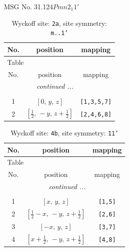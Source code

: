 \documentclass[fleqn,8pt]{jsarticle}
\begin{document}
\setcounter{MaxMatrixCols}{32}

\renewcommand{\tablename}{Table~}
\renewcommand{\figurename}{Figure~}
\begin{center}
\LARGE
MSG No. 31.124\quad$Pmn2_{1}1'$
\end{center}
\renewcommand{\arraystretch}{1.2}
\begin{longtable}{ccc}
\caption{Wyckoff site: {\tt 2a}, site symmetry: {\tt m..1'}}
 \\
 \hline \hline
No. & position & mapping \\ \hline \endfirsthead

\multicolumn{2}{l}{\tablename\ \thetable{}} \\
 \hline \hline
No. & position & mapping \\ \hline \endhead

 \hline \hline
\multicolumn{2}{r}{\footnotesize\it continued ...} \\ \endfoot

 \hline \hline
\multicolumn{2}{r}{} \\ \endlastfoot

1 & $\left[ 0,\, y,\, z \right]$ & {\tt [1,3,5,7]} \\ \hline
2 & $\left[ \frac{1}{2},\, - y,\, z + \frac{1}{2} \right]$ & {\tt [2,4,6,8]} \\
\end{longtable}
\renewcommand{\arraystretch}{1.2}
\begin{longtable}{ccc}
\caption{Wyckoff site: {\tt 4b}, site symmetry: {\tt 11'}}
 \\
 \hline \hline
No. & position & mapping \\ \hline \endfirsthead

\multicolumn{2}{l}{\tablename\ \thetable{}} \\
 \hline \hline
No. & position & mapping \\ \hline \endhead

 \hline \hline
\multicolumn{2}{r}{\footnotesize\it continued ...} \\ \endfoot

 \hline \hline
\multicolumn{2}{r}{} \\ \endlastfoot

1 & $\left[ x,\, y,\, z \right]$ & {\tt [1,5]} \\ \hline
2 & $\left[ \frac{1}{2} - x,\, - y,\, z + \frac{1}{2} \right]$ & {\tt [2,6]} \\ \hline
3 & $\left[ - x,\, y,\, z \right]$ & {\tt [3,7]} \\ \hline
4 & $\left[ x + \frac{1}{2},\, - y,\, z + \frac{1}{2} \right]$ & {\tt [4,8]} \\
\end{longtable}
\end{document}
